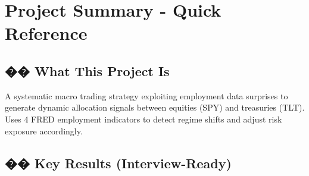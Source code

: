 \documentclass[12pt,a4paper]{article}
\begin{document}
\section*{Project Summary - Quick Reference}

\begin{center}
\end{center}

\subsection*{�� What This Project Is}

A systematic macro trading strategy exploiting employment data surprises to generate dynamic allocation signals between equities (SPY) and treasuries (TLT). Uses 4 FRED employment indicators to detect regime shifts and adjust risk exposure accordingly.

\subsection*{�� Key Results (Interview-Ready)}

\vspace{0.4cm}
\end{document}
